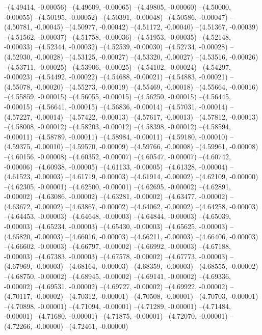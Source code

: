 --(4.49414, -0.00056)
--(4.49609, -0.00065)
--(4.49805, -0.00060)
--(4.50000, -0.00055)
--(4.50195, -0.00052)
--(4.50391, -0.00048)
--(4.50586, -0.00047)
--(4.50781, -0.00045)
--(4.50977, -0.00042)
--(4.51172, -0.00040)
--(4.51367, -0.00039)
--(4.51562, -0.00037)
--(4.51758, -0.00036)
--(4.51953, -0.00035)
--(4.52148, -0.00033)
--(4.52344, -0.00032)
--(4.52539, -0.00030)
--(4.52734, -0.00028)
--(4.52930, -0.00028)
--(4.53125, -0.00027)
--(4.53320, -0.00027)
--(4.53516, -0.00026)
--(4.53711, -0.00025)
--(4.53906, -0.00025)
--(4.54102, -0.00024)
--(4.54297, -0.00023)
--(4.54492, -0.00022)
--(4.54688, -0.00021)
--(4.54883, -0.00021)
--(4.55078, -0.00020)
--(4.55273, -0.00019)
--(4.55469, -0.00018)
--(4.55664, -0.00016)
--(4.55859, -0.00015)
--(4.56055, -0.00015)
--(4.56250, -0.00015)
--(4.56445, -0.00015)
--(4.56641, -0.00015)
--(4.56836, -0.00014)
--(4.57031, -0.00014)
--(4.57227, -0.00014)
--(4.57422, -0.00013)
--(4.57617, -0.00013)
--(4.57812, -0.00013)
--(4.58008, -0.00012)
--(4.58203, -0.00012)
--(4.58398, -0.00012)
--(4.58594, -0.00011)
--(4.58789, -0.00011)
--(4.58984, -0.00011)
--(4.59180, -0.00010)
--(4.59375, -0.00010)
--(4.59570, -0.00009)
--(4.59766, -0.00008)
--(4.59961, -0.00008)
--(4.60156, -0.00008)
--(4.60352, -0.00007)
--(4.60547, -0.00007)
--(4.60742, -0.00006)
--(4.60938, -0.00005)
--(4.61133, -0.00005)
--(4.61328, -0.00004)
--(4.61523, -0.00003)
--(4.61719, -0.00003)
--(4.61914, -0.00002)
--(4.62109, -0.00000)
--(4.62305, -0.00001)
--(4.62500, -0.00001)
--(4.62695, -0.00002)
--(4.62891, -0.00002)
--(4.63086, -0.00002)
--(4.63281, -0.00002)
--(4.63477, -0.00002)
--(4.63672, -0.00002)
--(4.63867, -0.00002)
--(4.64062, -0.00002)
--(4.64258, -0.00003)
--(4.64453, -0.00003)
--(4.64648, -0.00003)
--(4.64844, -0.00003)
--(4.65039, -0.00003)
--(4.65234, -0.00003)
--(4.65430, -0.00003)
--(4.65625, -0.00003)
--(4.65820, -0.00003)
--(4.66016, -0.00003)
--(4.66211, -0.00003)
--(4.66406, -0.00003)
--(4.66602, -0.00003)
--(4.66797, -0.00002)
--(4.66992, -0.00003)
--(4.67188, -0.00003)
--(4.67383, -0.00003)
--(4.67578, -0.00002)
--(4.67773, -0.00003)
--(4.67969, -0.00003)
--(4.68164, -0.00003)
--(4.68359, -0.00003)
--(4.68555, -0.00002)
--(4.68750, -0.00002)
--(4.68945, -0.00002)
--(4.69141, -0.00002)
--(4.69336, -0.00002)
--(4.69531, -0.00002)
--(4.69727, -0.00002)
--(4.69922, -0.00002)
--(4.70117, -0.00002)
--(4.70312, -0.00001)
--(4.70508, -0.00001)
--(4.70703, -0.00001)
--(4.70898, -0.00001)
--(4.71094, -0.00001)
--(4.71289, -0.00001)
--(4.71484, -0.00001)
--(4.71680, -0.00001)
--(4.71875, -0.00001)
--(4.72070, -0.00001)
--(4.72266, -0.00000)
--(4.72461, -0.00000)
